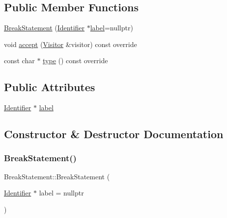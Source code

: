 \subsection*{Public Member Functions}
\begin{DoxyCompactItemize}
\item 
\hyperlink{struct_break_statement_a069ece35d82ad5cde60d51221f3b2d5f}{Break\+Statement} (\hyperlink{struct_identifier}{Identifier} $\ast$\hyperlink{struct_break_statement_a42b738327adc45037878958ebb488113}{label}=nullptr)
\item 
void \hyperlink{struct_break_statement_a915562cfa7dbbcadb0daecc3c3aa7d1f}{accept} (\hyperlink{struct_visitor}{Visitor} \&visitor) const override
\item 
const char $\ast$ \hyperlink{struct_break_statement_aac8689184dead2a21c563a8a30448e80}{type} () const override
\end{DoxyCompactItemize}
\subsection*{Public Attributes}
\begin{DoxyCompactItemize}
\item 
\hyperlink{struct_identifier}{Identifier} $\ast$ \hyperlink{struct_break_statement_a42b738327adc45037878958ebb488113}{label}
\end{DoxyCompactItemize}


\subsection{Constructor \& Destructor Documentation}
\mbox{\label{struct_break_statement_a069ece35d82ad5cde60d51221f3b2d5f}} 
\subsubsection{\texorpdfstring{Break\+Statement()}{BreakStatement()}}
{\footnotesize\ttfamily Break\+Statement\+::\+Break\+Statement (\begin{DoxyParamCaption}\item[{\hyperlink{struct_identifier}{Identifier} $\ast$}]{label = {\ttfamily nullptr} }\end{DoxyParamCaption})\hspace{0.3cm}{\ttfamily [inline]}}



